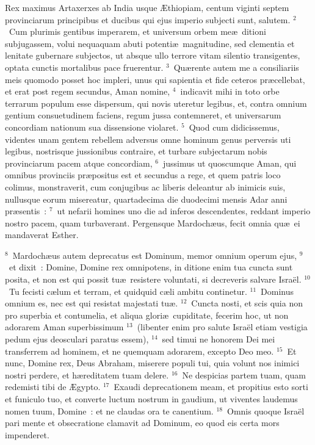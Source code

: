 \lettrine[lines=10,image=true,loversize=0.05,lraise=-0.03]{R}{}ex maximus Artaxerxes ab India usque \AE thiopiam, centum viginti septem provinciarum principibus et ducibus qui ejus imperio subjecti sunt, salutem.
${}^{2}$~Cum plurimis gentibus imperarem, et universum orbem me\ae\ ditioni subjugassem, volui nequaquam abuti potenti\ae\ magnitudine, sed clementia et lenitate gubernare subjectos, ut absque ullo terrore vitam silentio transigentes, optata cunctis mortalibus pace fruerentur.
${}^{3}$~Qu\ae rente autem me a consiliariis meis quomodo posset hoc impleri, unus qui sapientia et fide ceteros pr\ae cellebat, et erat post regem secundus, Aman nomine,
${}^{4}$~indicavit mihi in toto orbe terrarum populum esse dispersum, qui novis uteretur legibus, et, contra omnium gentium consuetudinem faciens, regum jussa contemneret, et universarum concordiam nationum sua dissensione violaret.
${}^{5}$~Quod cum didicissemus, videntes unam gentem rebellem adversus omne hominum genus perversis uti legibus, nostrisque jussionibus contraire, et turbare subjectarum nobis provinciarum pacem atque concordiam,
${}^{6}$~jussimus ut quoscumque Aman, qui omnibus provinciis pr\ae positus est et secundus a rege, et quem patris loco colimus, monstraverit, cum conjugibus ac liberis deleantur ab inimicis suis, nullusque eorum misereatur, quartadecima die duodecimi mensis Adar anni pr\ae sentis~:
${}^{7}$~ut nefarii homines uno die ad inferos descendentes, reddant imperio nostro pacem, quam turbaverant. Pergensque Mardoch\ae us, fecit omnia qu\ae\ ei mandaverat Esther.


${}^{8}$~Mardoch\ae us autem deprecatus est Dominum, memor omnium operum ejus,
${}^{9}$~et dixit~: Domine, Domine rex omnipotens, in ditione enim tua cuncta sunt posita, et non est qui possit tu\ae\ resistere voluntati, si decreveris salvare Isra\"el.
${}^{10}$~Tu fecisti c\ae lum et terram, et quidquid c\ae li ambitu continetur.
${}^{11}$~Dominus omnium es, nec est qui resistat majestati tu\ae .
${}^{12}$~Cuncta nosti, et scis quia non pro superbia et contumelia, et aliqua glori\ae\ cupiditate, fecerim hoc, ut non adorarem Aman superbissimum
${}^{13}$~(libenter enim pro salute Isra\"el etiam vestigia pedum ejus deosculari paratus essem),
${}^{14}$~sed timui ne honorem Dei mei transferrem ad hominem, et ne quemquam adorarem, excepto Deo meo.
${}^{15}$~Et nunc, Domine rex, Deus Abraham, miserere populi tui, quia volunt nos inimici nostri perdere, et h\ae reditatem tuam delere.
${}^{16}$~Ne despicias partem tuam, quam redemisti tibi de \AE gypto.
${}^{17}$~Exaudi deprecationem meam, et propitius esto sorti et funiculo tuo, et converte luctum nostrum in gaudium, ut viventes laudemus nomen tuum, Domine~: et ne claudas ora te canentium.
${}^{18}$~Omnis quoque Isra\"el pari mente et obsecratione clamavit ad Dominum, eo quod eis certa mors impenderet.

